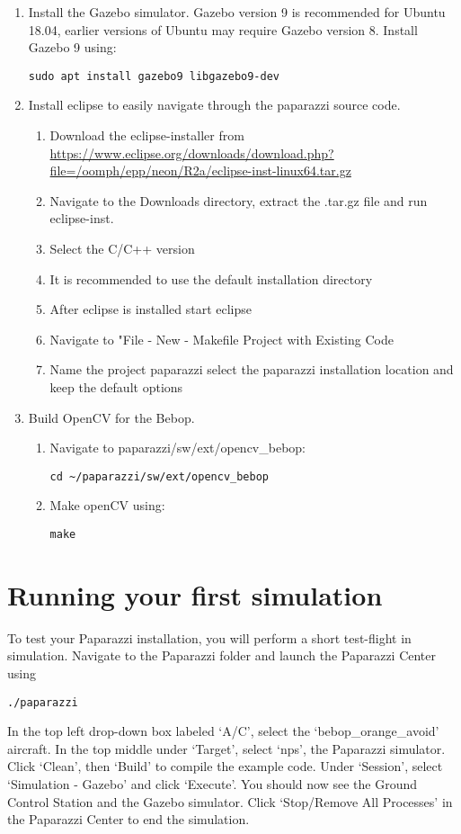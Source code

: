 \documentclass{article}
\begin{document}
\begin{enumerate}
{{\begin{lstlisting}[style=Bash]
\end{lstlisting}
}
}
\item{Install the Gazebo simulator. Gazebo version 9 is recommended for Ubuntu 18.04, earlier versions of Ubuntu may require Gazebo version 8. Install Gazebo 9 using:
\begin{lstlisting}[style=Bash]
sudo apt install gazebo9 libgazebo9-dev
\end{lstlisting}
}
\item{Install eclipse to easily navigate through the paparazzi source code.
\begin{enumerate}
\item{Download the eclipse-installer from \url{https://www.eclipse.org/downloads/download.php?file=/oomph/epp/neon/R2a/eclipse-inst-linux64.tar.gz}}
\item{Navigate to the Downloads directory, extract the .tar.gz file and run eclipse-inst.}
\item{Select the C/C++ version}
\item{It is recommended to use the default installation directory}
\item{After eclipse is installed start eclipse}
\item{Navigate to "File - New - Makefile Project with Existing Code}
\item{Name the project paparazzi select the paparazzi installation location and keep the default options}
\end{enumerate}
}
\item{Build OpenCV for the Bebop.
\begin{enumerate}
\item{Navigate to paparazzi/sw/ext/opencv\_bebop:
\begin{lstlisting}[style=Bash]
cd ~/paparazzi/sw/ext/opencv_bebop
\end{lstlisting}}
\item{Make openCV using:
\begin{lstlisting}[style=Bash]
make
\end{lstlisting}}
\end{enumerate}
}
\end{enumerate}


\section{Running your first simulation}
To test your Paparazzi installation, you will perform a short test-flight in simulation.
Navigate to the Paparazzi folder and launch the Paparazzi Center using
\begin{lstlisting}[style=Bash]
./paparazzi
\end{lstlisting}
In the top left drop-down box labeled `A/C', select the `bebop\_orange\_avoid' aircraft.
In the top middle under `Target', select `nps', the Paparazzi simulator.
Click `Clean', then `Build' to compile the example code.
Under `Session', select `Simulation - Gazebo' and click `Execute'. You should now see the Ground Control Station and the Gazebo simulator.
Click `Stop/Remove All Processes' in the Paparazzi Center to end the simulation.
\end{document}
